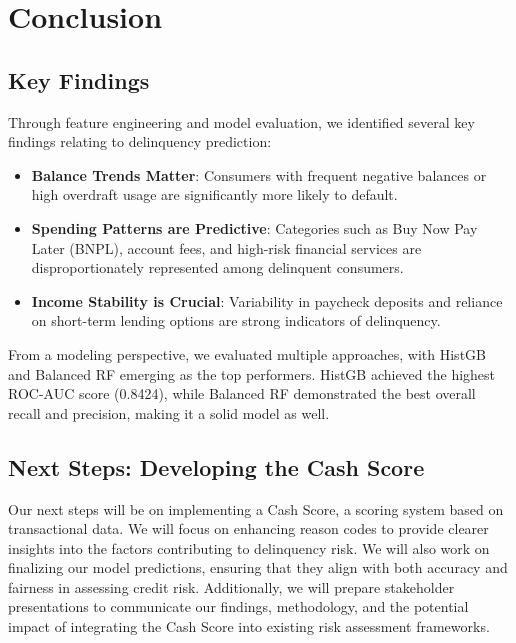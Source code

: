 \documentclass[12pt,letterpaper]{article}
\begin{document}
\section{Conclusion}

\subsection{Key Findings}

Through feature engineering and model evaluation, we identified several key findings relating to delinquency prediction:

\begin{itemize}
    \item \textbf{Balance Trends Matter}: Consumers with frequent negative balances or high overdraft usage are significantly more likely to default.
    \item \textbf{Spending Patterns are Predictive}: Categories such as Buy Now Pay Later (BNPL), account fees, and high-risk financial services are disproportionately represented among delinquent consumers.
    \item \textbf{Income Stability is Crucial}: Variability in paycheck deposits and reliance on short-term lending options are strong indicators of delinquency.
\end{itemize}

From a modeling perspective, we evaluated multiple approaches, with HistGB and Balanced RF emerging as the top performers. HistGB achieved the highest ROC-AUC score (0.8424), while Balanced RF demonstrated the best overall recall and precision, making it a solid model as well.

\subsection{Next Steps: Developing the Cash Score}

Our next steps will be on implementing a Cash Score, a scoring system based on transactional data. We will focus on enhancing reason codes to provide clearer insights into the factors contributing to delinquency risk. We will also work on finalizing our model predictions, ensuring that they align with both accuracy and fairness in assessing credit risk. Additionally, we will prepare stakeholder presentations to communicate our findings, methodology, and the potential impact of integrating the Cash Score into existing risk assessment frameworks.

\end{document}
